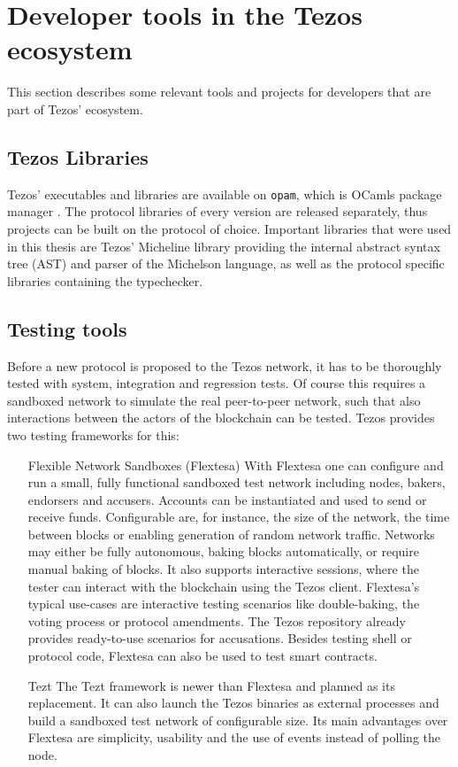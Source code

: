 
\section{Developer tools in the Tezos ecosystem}
This section describes some relevant tools and projects for developers that are part of Tezos' ecosystem.

\subsection{Tezos Libraries}
Tezos' executables and libraries are available on \texttt{opam}, which is OCamls package manager \cite{tezos_opam}. The protocol libraries of every version are released separately, thus projects can be built on the protocol of choice. Important libraries that were used in this thesis are Tezos' Micheline library providing the internal abstract syntax tree (AST) and parser of the Michelson language, as well as the protocol specific libraries containing the typechecker.

\subsection{Testing tools}
Before a new protocol is proposed to the Tezos network, it has to be thoroughly tested with system, integration and regression tests. Of course this requires a sandboxed network to simulate the real peer-to-peer network, such that also interactions between the actors of the blockchain can be tested. Tezos provides two testing frameworks for this:

\begin{itemize}
\item[Flexible Network Sandboxes (Flextesa)] With Flextesa one can configure and run a small, fully functional sandboxed test network including nodes, bakers, endorsers and accusers. Accounts can be instantiated and used to send or receive funds. Configurable are, for instance, the size of the network, the time between blocks or enabling generation of random network traffic. Networks may either be fully autonomous, baking blocks automatically, or require manual baking of blocks. It also supports interactive sessions, where the tester can interact with the blockchain using the Tezos client. Flextesa's typical use-cases are interactive testing scenarios like double-baking, the voting process or protocol amendments. The Tezos repository already provides ready-to-use scenarios for accusations. Besides testing shell or protocol code, Flextesa can also be used to test smart contracts.\cite{tezos_docs}
\item[Tezt] The Tezt framework is newer than Flextesa and planned as its replacement. It can also launch the Tezos binaries as external processes and build a sandboxed test network of configurable size. Its main advantages over Flextesa are simplicity, usability and the use of events instead of polling the node.\cite{tezos_docs}
\end{itemize}

